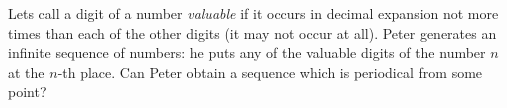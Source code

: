 \problem
Lets call a digit of a number \emph{valuable} if it occurs in decimal expansion
not more times than each of the other digits (it may not occur at all).
Peter generates an infinite sequence of numbers: he puts
any of the valuable digits of the number $n$ at the $n$-th place.
Can Peter obtain a sequence which is periodical from some point?

\solution

\endproblem
